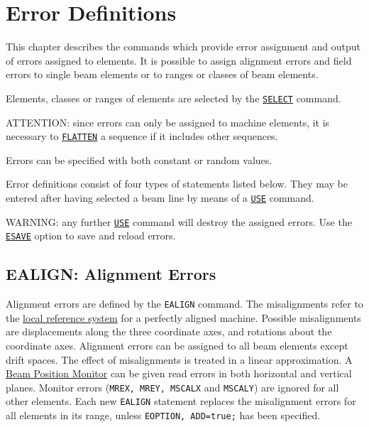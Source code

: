 
\chapter{Error Definitions}
\label{chap:error}
This chapter describes the commands which provide error assignment and
output of errors assigned to elements. It is possible to assign
alignment errors and field errors to single beam elements or to ranges
or classes of beam elements.

Elements, classes or ranges of elements are selected by the
\hyperref[sec:seclect]{\tt SELECT} command.

ATTENTION: since errors can only be assigned to machine elements, it is
necessary to \hyperref[sec:flatten]{\tt FLATTEN} a sequence
if it includes other sequences.

Errors can be specified with both constant or random values.

Error definitions consist of four types of statements listed below. They
may be entered after having selected a beam line by means of a
\hyperref[sec:use]{\tt USE} command.  

WARNING: any further \hyperref[sec:use]{\tt USE} command
will destroy the assigned errors. Use the
\hyperref[sec:esave]{\tt ESAVE} option to save and reload errors.



%

\section{EALIGN: Alignment Errors} %
\label{sec:ealign}

Alignment errors are defined by the {\tt EALIGN} command. 
The misalignments refer to the
\href{../Introduction/local_system.html}{local reference system} for a
perfectly aligned machine.  
Possible misalignments are displacements along the three coordinate
axes, and rotations about the coordinate axes. 
Alignment errors can be assigned to all beam elements except drift
spaces. 
The effect of misalignments is treated in a linear
approximation. 
A \hyperref[sec:monitor]{Beam Position Monitor} can be given read errors in 
both horizontal and vertical planes. 
Monitor errors ({\tt MREX, MREY, MSCALX} and {\tt MSCALY}) are
ignored for all other elements. Each new {\tt EALIGN} statement replaces the
misalignment errors for all elements in its range, unless {\tt EOPTION,
ADD=true;} has been specified.   

